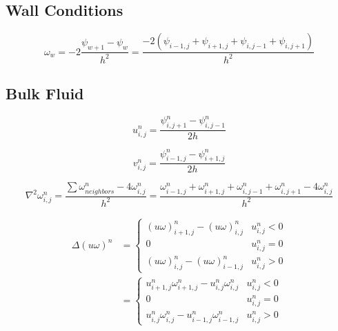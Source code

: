 \subsection{Wall Conditions}
\begin{equation}
    \omega_{w} = -2\frac{\psi_{w + 1} - \psi_{w}}{h^2} = \frac{-2(\psi_{i - 1, j} + \psi_{i + 1, j} + \psi_{i, j -1} + \psi_{i, j + 1})}{h^2}
\end{equation}


\subsection{Bulk Fluid}
\begin{equation}
    u_{i, j}^{n} = \frac{\psi_{i, j + 1}^{n} - \psi_{i, j - 1}^{n}}{2h}
\end{equation}

\begin{equation}
    v_{i, j}^{n} = \frac{\psi_{i - 1, j}^{n} - \psi_{i + 1, j}^{n}}{2h}
\end{equation}

\begin{equation}
    \nabla^2\omega_{i, j}^{n} = \frac{\sum \omega_{neighbors}^{n} - 4 \omega_{i, j}^{n}}{h^2} = \frac{\omega_{i - 1, j}^{n} + \omega_{i + 1, j}^{n} + \omega_{i, j - 1}^{n} + \omega_{i, j + 1}^{n} - 4 \omega_{i, j}^{n}}{h^2}
\end{equation}


\begin{equation}
    \begin{split}
    \Delta (u \omega)^n  & = \begin{cases} 
          (u\omega)_{i + 1, j}^{n} - (u\omega)_{i, j}^{n} & u_{i, j}^n < 0 \\
          0 & u_{i, j}^n = 0 \\
          (u\omega)_{i, j}^{n} - (u\omega)_{i - 1, j}^{n} & u_{i, j}^n > 0 
       \end{cases} \\
        & = \begin{cases} 
              u_{i + 1, j}^{n}\omega_{i + 1, j}^{n} - u_{i, j}^{n}\omega_{i, j}^{n} & u_{i, j}^n < 0 \\
              0 & u_{i, j}^n = 0 \\
              u_{i, j}^{n}\omega_{i, j}^{n} - u_{i - 1, j}^{n}\omega_{i - 1, j}^{n} & u_{i, j}^n > 0 
           \end{cases}
    \end{split}
\end{equation}



